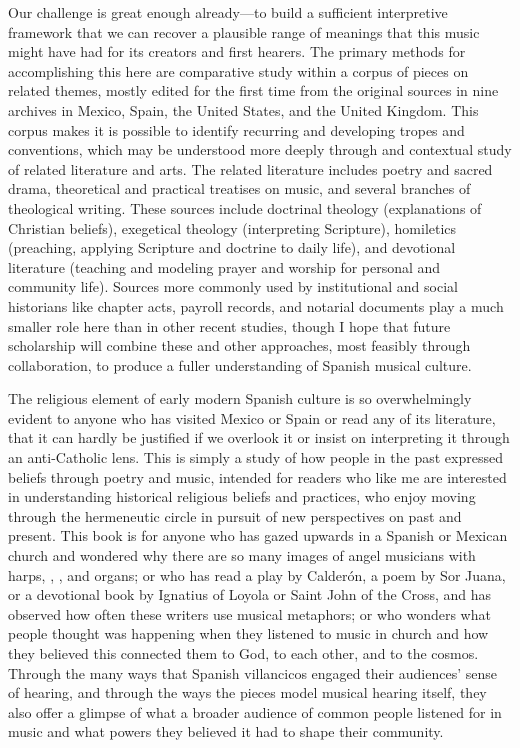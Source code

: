Our challenge is great enough already---to build a sufficient interpretive
framework that we can recover a plausible range of meanings that this music
might have had for its creators and first hearers.
The primary methods for accomplishing this here are comparative study within a
corpus of pieces on related themes, mostly edited for the first time from the
original sources in nine archives in Mexico, Spain, the United States, and the
United Kingdom.
This corpus makes it is possible to identify recurring and developing tropes
and conventions, which may be understood more deeply through and contextual
study of related literature and arts.
The related literature includes poetry and sacred drama, theoretical and
practical treatises on music, and several branches of theological writing.
These sources include doctrinal theology (explanations of Christian beliefs),
exegetical theology (interpreting Scripture), homiletics (preaching, applying
Scripture and doctrine to daily life), and devotional literature (teaching and
modeling prayer and worship for personal and community life).
Sources more commonly used by institutional and social historians like chapter
acts, payroll records, and notarial documents play a much smaller role here
than in other recent studies, though I hope that future scholarship will
combine these and other approaches, most feasibly through collaboration, to
produce a fuller understanding of Spanish musical culture.

The religious element of early modern Spanish culture is so overwhelmingly
evident to anyone who has visited Mexico or Spain or read any of its
literature, that it can hardly be justified if we overlook it or insist on
interpreting it through an anti-Catholic lens.
This is simply a study of how people in the past expressed beliefs through
poetry and music, intended for readers who like me are interested in
understanding historical religious beliefs and practices, who enjoy moving
through the hermeneutic circle in pursuit of new perspectives on past and
present.%
    \citXXX[ricoeur]
This book is for anyone who has gazed upwards in a Spanish or Mexican church
and wondered why there are so many images of angel musicians with harps,
, , and organs; or who has read a play by
Calderón, a poem by Sor Juana, or a devotional book by Ignatius of Loyola or
Saint John of the Cross, and has observed how often these writers use musical
metaphors; or who wonders what people thought was happening when they listened
to music in church and how they believed this connected them to God, to each
other, and to the cosmos.
Through the many ways that Spanish villancicos engaged their audiences' sense
of hearing, and through the ways the pieces model musical hearing itself, they
also offer a glimpse of what a broader audience of common people listened for
in music and what powers they believed it had to shape their community.

